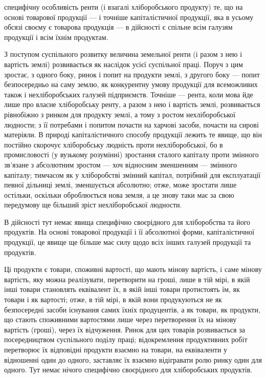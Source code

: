 \parcont{}  %
специфічну особливість ренти (і взагалі хліборобського продукту) те, що на основі
товарової продукції — і точніше капіталістичної продукції, яка в усьому обсязі
своєму є товарова продукція — в дійсності є спільне всім галузям продукції
і всім їхнім продуктам.

З поступом суспільного розвитку величина земельної ренти (і разом з нею
і вартість землі) розвивається як наслідок усієї суспільної праці. Поруч з цим
зростає, з одного боку, ринок і попит на продукти землі, з другого боку — попит
безпосередньо на саму землю, як конкурентну умову продукції для всеможливих
також і нехліборобських галузей підприємств. Точніше — рента, коли мова
йде лише про власне хліборобську ренту, а разом з нею і вартість землі, розвивається
рівнобіжно з ринком для продукту землі, а тому з ростом нехліборобської
людности; з її потребами і попитом почасти на харчові засоби, почасти
на сирові матеріяли. В природі капіталістичного способу продукції лежить те
явище, що він постійно скорочує хліборобську людність проти нехліборобської,
бо в промисловості (у вузькому розумінні) зростання сталого капіталу проти
змінного зв’язане з абсолютним зростом — хоч відносним зменшенням — змінного
капіталу; тимчасом як у хліборобстві змінний капітал, потрібний для експлуатації
певної дільниці землі, зменшується абсолютно; отже, може зростати лише остільки,
оскільки оброблюється нова земля, а це знову таки має за свою передумову ще
більший зріст нехліборобської людности.

В дійсності тут немає явища специфічно своєрідного для хліборобства та
його продуктів. На основі товарової продукції і її абсолютної форми, капіталістичної
продукції, це явище ще більше має силу щодо всіх інших галузей продукції
та продуктів.

Ці продукти є товари, споживні вартості, що мають мінову вартість, і саме
мінову вартість, яку можна реалізувати, перетворити на гроші, лише в тій мірі,
в якій інші товари становлять еквівалент їх, в якій інші товари протистоять їм, як
товари і як вартості; отже, в тій мірі, в якій вони продукуються не як безпосередні
засоби існування самих їхніх продуцентів, а як товари, як продукти,
що стають споживними вартостями лише через перетворення їх на мінову
вартість (гроші), через їх відчуження. Ринок для цих товарів розвивається
за посередництвом суспільного поділу праці; відокремлення продуктивних робіт
перетворює їх відповідні продукти взаємно на товари, на еквіваленти у відношенні
один до одного, заставляє їх взаємно відігравати ролю ринку один для
одного. Тут немає нічого специфічно своєрідного для хліборобських продуктів.


